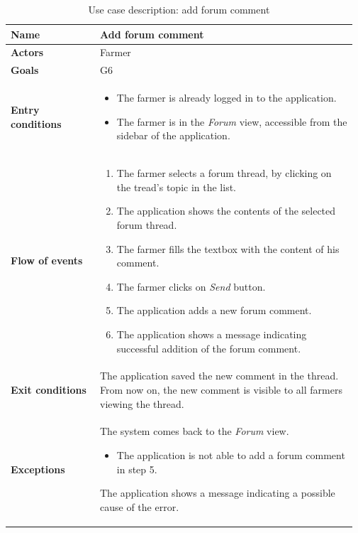 \begin{table}[H]
    \centering
	\begin{tabular}{@{}p{0.25\linewidth} p{0.72\linewidth}@{}}
\toprule
		\textbf{Name}               & Add forum comment \\
		\midrule
		\textbf{Actors}             & Farmer\\
		\midrule
		\textbf{Goals}              & G6 \\
		\midrule
		
		\textbf{Entry conditions}   & \begin{itemize}[leftmargin=.4cm,noitemsep,topsep=0pt,before=\vspace{-3mm},after=\vspace{-4mm}]
		    \item The farmer is already logged in to the application.
		    \item The farmer is in the \textit{Forum} view, accessible from the sidebar of the application.
		\end{itemize}\\
		\midrule
		
		\textbf{Flow of events}     & \begin{enumerate}[leftmargin=.4cm,noitemsep,topsep=0pt,before=\vspace{-3mm},after=\vspace{-4mm}]
		    \item The farmer selects a forum thread, by clicking on the tread's topic in the list.
		    \item The application shows the contents of the selected forum thread.
		    \item The farmer fills the textbox with the content of his comment.
		    \item The farmer clicks on \textit{Send} button.
		    \item The application adds a new forum comment.
		    \item The application shows a message indicating successful addition of the forum comment.
		\end{enumerate}\\
		\midrule
		\textbf{Exit conditions} & The application saved the new comment in the thread. From now on, the new comment is visible to all farmers viewing the thread. \\
		\midrule
		
		\textbf{Exceptions}         &
	    The system comes back to the \textit{Forum} view.
	    \begin{itemize}[leftmargin=.4cm,noitemsep,topsep=0pt]
		   \item The application is not able to add a forum comment in step 5. 
		\end{itemize}
		The application shows a message indicating a possible cause of the error.
		\\\bottomrule
	\end{tabular}
	\caption{Use case description: add forum comment} 
\end{table}

